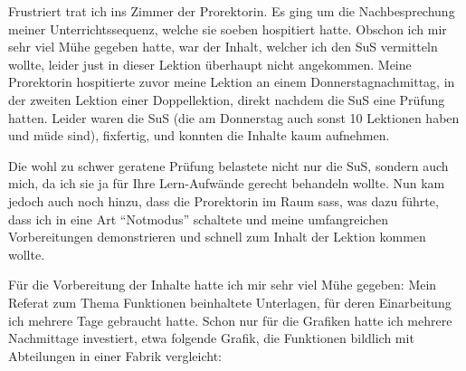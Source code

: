 \begin{myExBox}[title=Beispiel aus der eigenen Unterrichtserfahrung]
  Frustriert trat ich ins Zimmer der Prorektorin. Es ging um die Nachbesprechung meiner Unterrichtssequenz, welche sie soeben hospitiert hatte. Obschon ich mir sehr viel Mühe gegeben hatte, war der Inhalt, welcher ich den SuS vermitteln wollte, leider just in dieser Lektion überhaupt nicht angekommen. Meine Prorektorin hospitierte zuvor meine Lektion an einem Donnerstagnachmittag, in der zweiten Lektion einer Doppellektion, direkt nachdem die SuS eine Prüfung hatten. Leider waren die SuS (die am Donnerstag auch sonst 10 Lektionen haben und müde sind), fixfertig, und konnten die Inhalte kaum aufnehmen.

  Die wohl zu schwer geratene Prüfung belastete nicht nur die SuS, sondern auch mich, da ich sie ja für Ihre Lern-Aufwände gerecht behandeln wollte. Nun kam jedoch auch noch hinzu, dass die Prorektorin im Raum sass, was dazu führte, dass ich in eine Art \enquote{Notmodus} schaltete und meine umfangreichen Vorbereitungen demonstrieren und schnell zum Inhalt der Lektion kommen wollte.

  Für die Vorbereitung der Inhalte hatte ich mir sehr viel Mühe gegeben: Mein Referat zum Thema Funktionen beinhaltete Unterlagen, für deren Einarbeitung ich mehrere Tage gebraucht hatte. Schon nur für die Grafiken hatte ich mehrere Nachmittage investiert, etwa folgende Grafik, die Funktionen bildlich mit Abteilungen in einer Fabrik vergleicht:


\end{myExBox}
